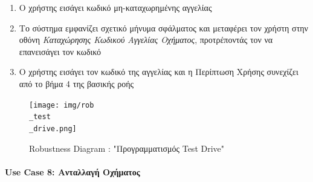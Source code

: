 \documentclass{../ol-softwaremanual}
\begin{document}
	\begin{enumerate}
		\item Ο χρήστης εισάγει κωδικό μη-καταχωρημένης αγγελίας
		\item Το σύστημα εμφανίζει σχετικό μήνυμα σφάλματος και μεταφέρει τον χρήστη στην οθόνη \textit{Καταχώρησης Κωδικού Αγγελίας Οχήματος}, προτρέποντάς τον να επανεισάγει τον κωδικό
		\item Ο χρήστης εισάγει τον κωδικό της αγγελίας και η Περίπτωση Χρήσης συνεχίζει από το βήμα 4 της βασικής ροής
	\end{enumerate}
	
	\begin{figure}[htbp!]
		\texttt{[image: img/rob\\\_test\\\_drive.png]}
		\caption{\en Robustness Diagram : "\gr Προγραμματισμός \en Test Drive"\gr}
	\end{figure}
	
	\newpage
	\centering
	
	\paragraph{\en Use Case 8: \gr  Ανταλλαγή Οχήματος \gr}
	
\end{document}
